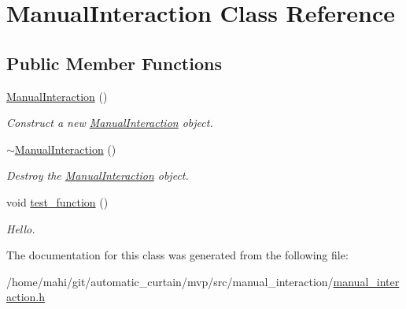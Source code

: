 \hypertarget{classManualInteraction}{}\section{Manual\+Interaction Class Reference}
\label{classManualInteraction}
\subsection*{Public Member Functions}
\begin{DoxyCompactItemize}
\item 
\mbox{\label{classManualInteraction_a985c5461281d82a30b178376fb9c3fb3}} 
\hyperlink{classManualInteraction_a985c5461281d82a30b178376fb9c3fb3}{Manual\+Interaction} ()
\begin{DoxyCompactList}\small\item\em Construct a new \hyperlink{classManualInteraction}{Manual\+Interaction} object. \end{DoxyCompactList}\item 
\mbox{\label{classManualInteraction_a761406994ea72ce26d6bef061fb5ae2b}} 
\hyperlink{classManualInteraction_a761406994ea72ce26d6bef061fb5ae2b}{$\sim$\+Manual\+Interaction} ()
\begin{DoxyCompactList}\small\item\em Destroy the \hyperlink{classManualInteraction}{Manual\+Interaction} object. \end{DoxyCompactList}\item 
\mbox{\label{classManualInteraction_a7782f4d4ba9d4977e253f17b7ab95198}} 
void \hyperlink{classManualInteraction_a7782f4d4ba9d4977e253f17b7ab95198}{test\+\_\+function} ()
\begin{DoxyCompactList}\small\item\em Hello. \end{DoxyCompactList}\end{DoxyCompactItemize}


The documentation for this class was generated from the following file\+:\begin{DoxyCompactItemize}
\item 
/home/mahi/git/automatic\+\_\+curtain/mvp/src/manual\+\_\+interaction/\hyperlink{manual__interaction_8h}{manual\+\_\+interaction.\+h}\end{DoxyCompactItemize}
